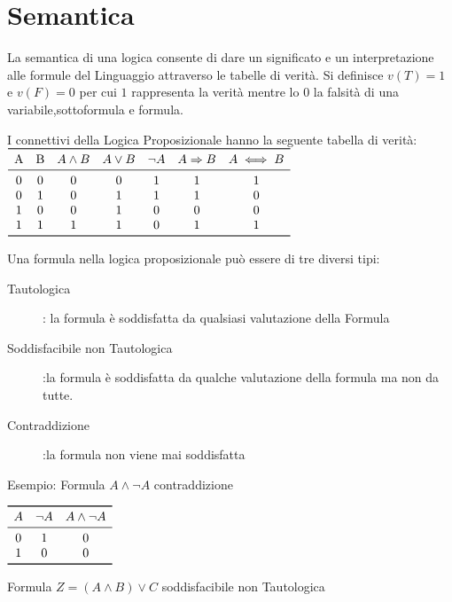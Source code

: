 \section{Semantica}
La semantica di una logica consente di dare un significato e un interpretazione
 alle formule del Linguaggio attraverso le tabelle di verità.\newline
Si definisce $v(T) = 1$ e $v(F) = 0$ per cui $1$ rappresenta la verità mentre lo $0$
la falsità di una variabile,sottoformula e formula.

I connettivi della Logica Proposizionale hanno la seguente tabella di verità:\newline
$\begin{array}{ccccccc}
\toprule
\text{A} & \text{B} & A \land B & A \lor B & \neg A & A \Rightarrow B & A \iff B \\
\midrule
    0 & 0 & 0 & 0 & 1 & 1 & 1 \\
    0 & 1 & 0 & 1 & 1 & 1 & 0 \\
    1 & 0 & 0 & 1 & 0 & 0 & 0 \\
    1 & 1 & 1 & 1 & 0 & 1 & 1 \\
\bottomrule
\end{array}$\newline

Una formula nella logica proposizionale può essere di tre diversi tipi:
\begin{description}
    \item[Tautologica]: la formula è soddisfatta da qualsiasi valutazione della Formula
    \item[Soddisfacibile non Tautologica]:la formula è soddisfatta da qualche valutazione
                        della formula ma non da tutte.
    \item[Contraddizione]:la formula non viene mai soddisfatta
\end{description}

Esempio:\newline
Formula $A \land \neg A$ \quad contraddizione

$\begin{array}{ccc}
\toprule A & \neg A & A \land \neg A \\
\midrule
        0 & 1 & 0 \\
        1 & 0 & 0 \\
\bottomrule
\end{array}$\newpage

Formula $Z = (A \land B) \lor C$  soddisfacibile non Tautologica

